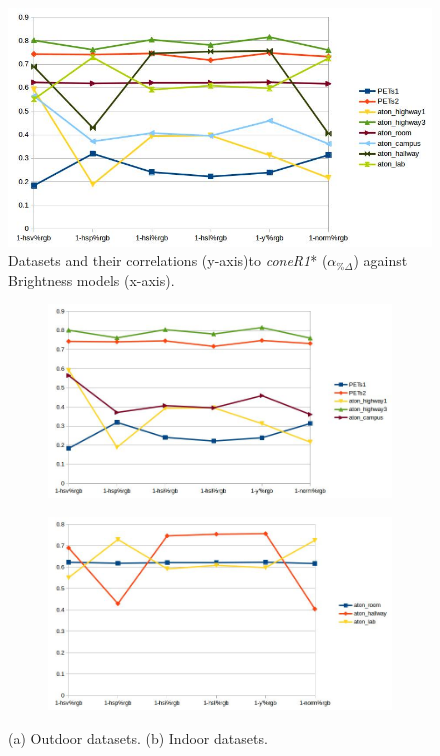 \documentclass[12pt]{report}
\begin{document}
\begin{figure}
  \includegraphics[width=\linewidth]{figures/brightness/rgb/correlation_x.jpg}
  \caption{Datasets and their correlations (y-axis)to \textit{coneR1}* ($\alpha_{\%\Delta}$) against Brightness models (x-axis).}
\label{fig:brightness_corr_rgb}
\end{figure}

\begin{figure}
\centering
\begin{subfigure}{.8\linewidth}
  \includegraphics[width=1\linewidth]{figures/brightness/rgb/correlation_outside.jpg}
  \caption{}
\end{subfigure}
\hfill
\begin{subfigure}{.8\linewidth}
  \includegraphics[width=1\linewidth]{figures/brightness/rgb/correlation_inside.jpg}
  \caption{}
\end{subfigure}

\caption{(a) Outdoor datasets. (b) Indoor datasets.}
\label{fig:brightness_indoor_outdoor_rgb}
\end{figure}
\end{document}
